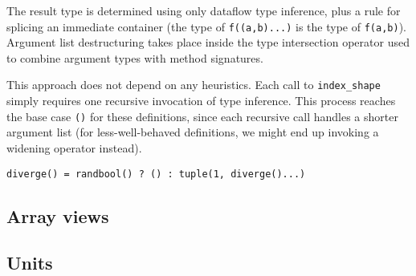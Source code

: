 The result type is determined using only dataflow type inference, plus a
rule for splicing an immediate container (the type of \texttt{f((a,b)...)} is
the type of \texttt{f(a,b)}). Argument list destructuring takes place inside
the type intersection operator used to combine argument types with method
signatures.

This approach does not depend on any heuristics. Each call to \texttt{index\_shape}
simply requires one recursive invocation of type inference. This process reaches
the base case \texttt{()} for these definitions, since each recursive call
handles a shorter argument list (for less-well-behaved definitions, we might
end up invoking a widening operator instead).


\begin{verbatim}
diverge() = randbool() ? () : tuple(1, diverge()...)
\end{verbatim}

\subsection{Array views}

\subsection{Units}

